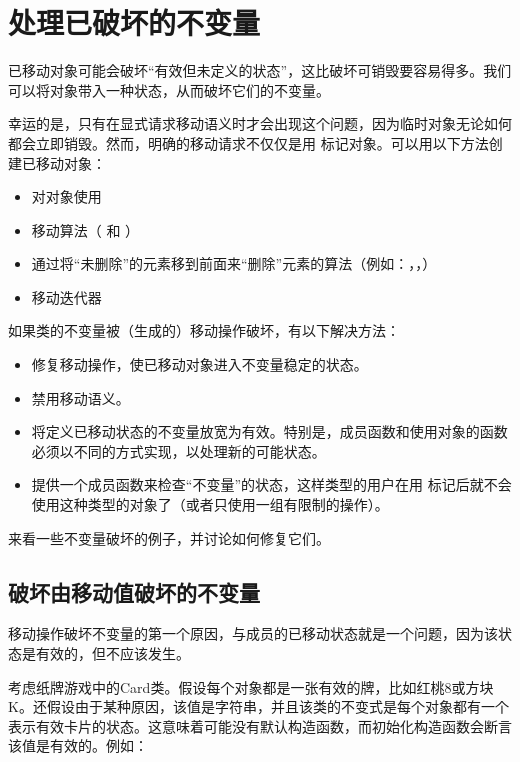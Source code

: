 \section{处理已破坏的不变量}
已移动对象可能会破坏“有效但未定义的状态”，这比破坏可销毁要容易得多。我们可以将对象带入一种状态，从而破坏它们的不变量。

幸运的是，只有在显式请求移动语义时才会出现这个问题，因为临时对象无论如何都会立即销毁。然而，明确的移动请求不仅仅是用  标记对象。可以用以下方法创建已移动对象：

\begin{itemize}
	\item 对对象使用 
	\item 移动算法（ 和 ）
	\item 通过将“未删除”的元素移到前面来“删除”元素的算法（例如：，，）
	\item 移动迭代器
\end{itemize}

如果类的不变量被（生成的）移动操作破坏，有以下解决方法：

\begin{itemize}
	\item 修复移动操作，使已移动对象进入不变量稳定的状态。
	\item 禁用移动语义。
	\item 将定义已移动状态的不变量放宽为有效。特别是，成员函数和使用对象的函数必须以不同的方式实现，以处理新的可能状态。
	\item 提供一个成员函数来检查“不变量”的状态，这样类型的用户在用  标记后就不会使用这种类型的对象了（或者只使用一组有限制的操作）。
\end{itemize}

来看一些不变量破坏的例子，并讨论如何修复它们。

\subsection{破坏由移动值破坏的不变量}

移动操作破坏不变量的第一个原因，与成员的已移动状态就是一个问题，因为该状态是有效的，但不应该发生。

考虑纸牌游戏中的Card类。假设每个对象都是一张有效的牌，比如红桃8或方块K。还假设由于某种原因，该值是字符串，并且该类的不变式是每个对象都有一个表示有效卡片的状态。这意味着可能没有默认构造函数，而初始化构造函数会断言该值是有效的。例如：

